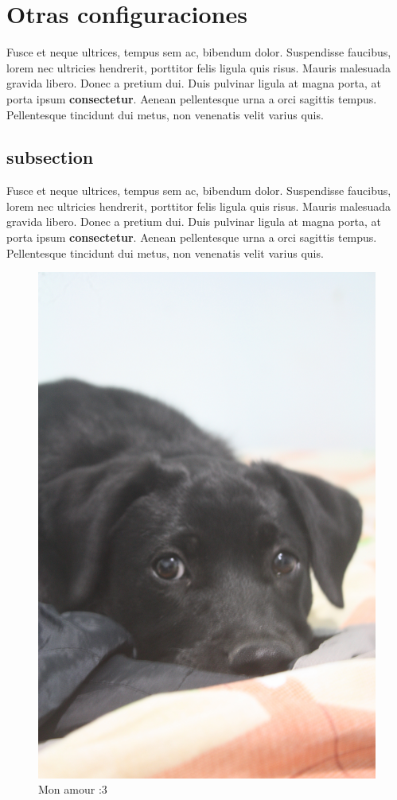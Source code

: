 \documentclass[12pt,letterpaper,oneside]{book}
\begin{document}
\section{Otras configuraciones}

\noindent Fusce et neque ultrices, tempus sem ac, bibendum dolor. Suspendisse faucibus, lorem nec ultricies hendrerit, porttitor felis ligula quis risus. Mauris malesuada gravida libero. Donec a pretium dui. Duis pulvinar ligula at magna porta, at porta ipsum \textbf{consectetur}. Aenean pellentesque urna a orci sagittis tempus. Pellentesque tincidunt dui metus, non venenatis velit varius quis.

\subsection{subsection}
\noindent Fusce et neque ultrices, tempus sem ac, bibendum dolor. Suspendisse faucibus, lorem nec ultricies hendrerit, porttitor felis ligula quis risus. Mauris malesuada gravida libero. Donec a pretium dui. Duis pulvinar ligula at magna porta, at porta ipsum \textbf{consectetur}. Aenean pellentesque urna a orci sagittis tempus. Pellentesque tincidunt dui metus, non venenatis velit varius quis.

\begin{figure}[h]
\centering
\caption{Mon amour :3}
\includegraphics[scale=.06]{img/milla.jpg}

\end{figure}
\end{document}

